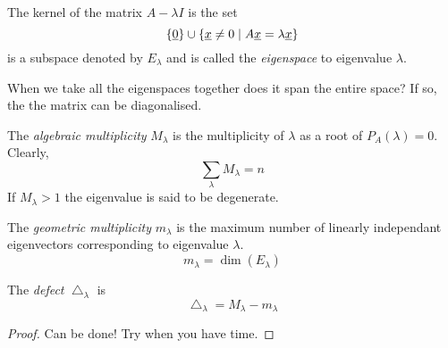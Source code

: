 \documentclass{article}
\numberwithin{equation}{section}
\begin{document}
\begin{defi}[Eigenspace]
    The kernel of the matrix $A - \lambda I$ is the set 
    \[
        \left\{ \underline{0} \right\} \cup \left\{ \underline{x} \neq 0 \mid A \underline{x} = \lambda \underline{x} \right\}  
    \]
    is a subspace denoted by $E_\lambda$ and is called the \emph{eigenspace} to eigenvalue $\lambda$.
\end{defi}

When we take all the eigenspaces together does it span the entire space? If so, the the matrix can be diagonalised.

\begin{defi}
    The \emph{algebraic multiplicity} $M_\lambda$ is the multiplicity of $\lambda$ as a root of $P_A(\lambda) = 0$.
    Clearly, 
    \[
        \sum_{\lambda} M_\lambda = n  
    \]
    If $M_\lambda > 1$ the eigenvalue is said to be degenerate.
\end{defi}
\begin{defi}
    The \emph{geometric multiplicity} $m_\lambda$ is the maximum number of linearly independant eigenvectors corresponding to eigenvalue $\lambda$.
    \[
        m_\lambda = \dim(E_\lambda)  
    \]
\end{defi}
\begin{defi}[Defect]
    The \emph{defect} $\bigtriangleup_\lambda$ is 
    \[
        \bigtriangleup_\lambda = M_\lambda - m_\lambda  
    \]
\end{defi}
\begin{proof}
    Can be done! Try when you have time.
\end{proof}
\end{document}
